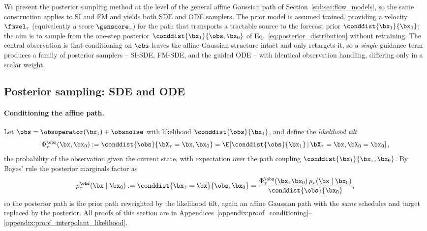 We present the posterior sampling method at the level of the general affine Gaussian path of Section~\ref{subsec:flow_models}, so the same construction applies to SI and FM and yields both SDE and ODE samplers. The prior model is assumed trained, providing a velocity $\fmvel_\tau$ (equivalently a score $\genscore_\tau$) for the path that transports a tractable source to the forecast prior $\conddist{\bx_1}{\bx_0}$; the aim is to sample from the one-step posterior $\conddist{\bx_1}{\obs,\bx_0}$ of Eq.~\eqref{eq:posterior_distribution} without retraining. The central observation is that conditioning on $\obs$ leaves the affine Gaussian structure intact and only retargets it, so a \emph{single} guidance term produces a family of posterior samplers -- SI-SDE, FM-SDE, and the guided ODE -- with identical observation handling, differing only in a scalar weight.

\subsection{Posterior sampling: SDE and ODE}
\label{subsec:posterior_dynamics}

\paragraph{Conditioning the affine path.}
Let $\obs = \obsoperator(\bx_1) + \obsnoise$ with likelihood $\conddist{\obs}{\bx_1}$, and define the \emph{likelihood tilt}
\begin{align}\label{eq:likelihood_tilt}
    \Phi_\tau^{\obs}(\bx,\bx_0) := \conddist{\obs}{\bX_\tau=\bx,\bx_0}
    = \E\!\left[\conddist{\obs}{\bx_1}\,\middle|\,\bX_\tau=\bx,\bX_0=\bx_0\right],
\end{align}
the probability of the observation given the current state, with expectation over the path coupling $\conddist{\bx_1}{\bx_\tau,\bx_0}$. By Bayes' rule the posterior marginals factor as
\begin{align}\label{eq:posterior_marginal}
    p_\tau^{\obs}(\bx\mid\bx_0) := \conddist{\bx_\tau=\bx}{\obs,\bx_0}
    = \frac{\Phi_\tau^{\obs}(\bx,\bx_0)\,p_\tau(\bx\mid\bx_0)}{\conddist{\obs}{\bx_0}},
\end{align}
so the posterior path is the prior path reweighted by the likelihood tilt, again an affine Gaussian path with the \emph{same} schedules and target replaced by the posterior. All proofs of this section are in Appendices~\ref{appendix:proof_conditioning}--\ref{appendix:proof_interpolant_likelihood}.

